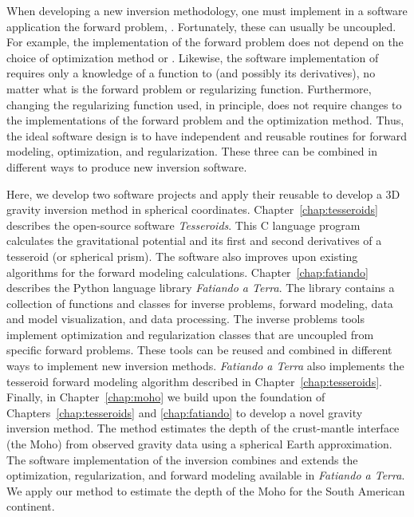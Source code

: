When developing a new inversion methodology, one must implement in a software
application \DIFdelbegin {}\DIFdelend \DIFaddbegin {}\DIFaddend the forward problem, \DIFdelbegin {}\DIFdelend \DIFaddbegin {}\DIFaddend .
Fortunately, these \DIFdelbegin {}\DIFdelend \DIFaddbegin {}\DIFaddend can usually be uncoupled.
For example, the implementation of the forward problem does not depend on the
choice of optimization method or \DIFdelbegin {}\DIFdelend \DIFaddbegin {}\DIFaddend .
Likewise, the software implementation of \DIFdelbegin {}\DIFdelend \DIFaddbegin {}\DIFaddend requires
only a knowledge of a function to \DIFdelbegin {}\DIFdelend \DIFaddbegin {}\DIFaddend (and possibly its derivatives),
no matter what is the forward problem or regularizing function.
Furthermore, changing the regularizing function used, in principle, does not
require changes to the implementations of the forward problem and the
optimization method.
Thus, the ideal software design is to have independent and reusable routines
for forward modeling, optimization, and regularization.
These three \DIFdelbegin {}\DIFdelend \DIFaddbegin {}\DIFaddend can be combined in different ways to produce
new inversion software.

Here, we develop two software projects and apply their reusable \DIFdelbegin {}\DIFdelend \DIFaddbegin {}\DIFaddend to
develop a 3D gravity inversion method in spherical coordinates.
Chapter~\ref{chap:tesseroids} describes the open-source software
\textit{Tesseroids}.
This C language program calculates the gravitational potential and its first
and second derivatives of a tesseroid (or spherical prism).
The software also improves upon existing algorithms for the forward modeling
calculations.
Chapter~\ref{chap:fatiando} describes the Python language library
\textit{Fatiando a Terra}.
The library contains a collection of functions and classes for inverse
problems, forward modeling, data and model visualization, and data processing.
The inverse problems tools implement optimization and regularization classes
that are uncoupled from specific forward problems.
These tools can be reused and combined in different ways to implement new
inversion methods.
\textit{Fatiando a Terra} also implements the tesseroid forward modeling
algorithm described in Chapter~\ref{chap:tesseroids}.
Finally, in Chapter~\ref{chap:moho} we build upon the foundation of
Chapters~\ref{chap:tesseroids} and \ref{chap:fatiando} to develop a novel
gravity inversion method.
The method estimates the depth of the crust-mantle interface (the Moho) from
observed gravity data using a spherical Earth approximation.
The software implementation of the inversion combines and extends the
optimization, regularization, and forward modeling available in
\textit{Fatiando a Terra}.
We apply our method to estimate the depth of the Moho for the South American
continent.
